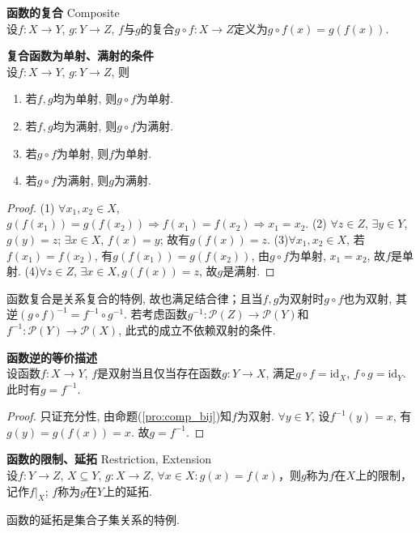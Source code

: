 \begin{dfn} \textbf{函数的复合} Composite\\
设$f:X \to Y$, $g: Y\to Z$, $f$与$g$的复合$g\circ f: X\to Z$定义为$g\circ f(x)=g(f(x))$. 
\end{dfn}

\begin{pro} \textbf{复合函数为单射、满射的条件}\\
设$f:X \to Y$, $g: Y\to Z$, 则
\begin{enumerate}
    \item 若$f,g$均为单射, 则$g\circ f$为单射.
    \item 若$f,g$均为满射, 则$g\circ f$为满射.
    \item 若$g\circ f$为单射, 则$f$为单射.
    \item 若$g\circ f$为满射, 则$g$为满射.
\end{enumerate}
\label{pro:comp_bij}
\end{pro}
\begin{proof}
(1) $\forall x_1,x_2\in X$, $g(f(x_1))=g(f(x_2))\Rightarrow f(x_1)=f(x_2)\Rightarrow x_1=x_2$. 
(2) $\forall z\in Z$, $\exists y\in Y$, $g(y)=z$; $\exists x\in X$, $f(x)=y$; 故有$g(f(x))=z$. (3)$\forall x_1,x_2 \in X$, 若$f(x_1)=f(x_2)$, 有$g(f(x_1))=g(f(x_2))$, 由$g\circ f$为单射, $x_1=x_2$, 故$f$是单射. (4)$\forall z \in Z$, $\exists x\in X, g(f(x))=z$, 故$g$是满射.
\end{proof}
函数复合是关系复合的特例, 故也满足结合律；且当$f,g$为双射时$g\circ f$也为双射, 其逆$(g\circ f)^{-1}=f^{-1}\circ g^{-1}$. 若考虑函数$g^{-1}:\mathcal{P}(Z)\to \mathcal{P}(Y)$和$f^{-1}:\mathcal{P}(Y)\to \mathcal{P}(X)$, 此式的成立不依赖双射的条件.

\begin{pro} \textbf{函数逆的等价描述}\\
设函数$f:X\to Y$, $f$是双射当且仅当存在函数$g:Y\to X$, 满足$g\circ f={\mathrm{id}}_{X}$, $f\circ g={\mathrm{id}}_{Y}$. 此时有$g=f^{-1}$. 
\label{pro:func_inverse}
\end{pro}
\begin{proof} 只证充分性, 由命题(\ref{pro:comp_bij})知$f$为双射. $\forall y \in Y$, 设$f^{-1}(y)=x$, 有$g(y)=g(f(x))=x$. 故$g=f^{-1}$. 
\end{proof}

\begin{dfn} \textbf{函数的限制、延拓} Restriction, Extension\\
设$f:Y\to Z$, $X\subseteq Y$, $g:X \to Z$, $\forall x\in X: g(x)=f(x)$，则$g$称为$f$在$X$上的限制，记作$f|_X$; $f$称为$g$在$Y$上的延拓. 
\end{dfn}
函数的延拓是集合子集关系的特例.


